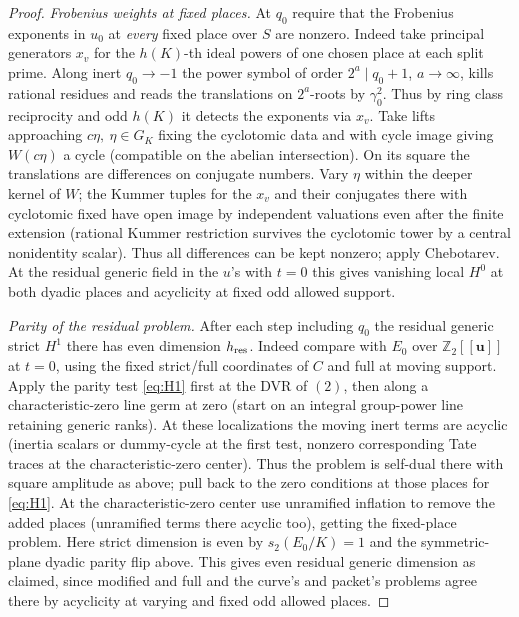\begin{proof}
\emph{Frobenius weights at fixed places.}
At \(q_0\) require that the Frobenius exponents in \(u_0\) at \emph{every} fixed place over \(S\) are nonzero. Indeed take principal generators \(x_v\) for the \(h(K)\)-th ideal powers of one chosen place at each split prime. Along inert \(q_0\to-1\) the power symbol of order \(2^a\mid q_0+1\), \(a\to\infty\), kills rational residues and reads the translations on \(2^a\)-roots by \(\gamma_0^2\). Thus by ring class reciprocity and odd \(h(K)\) it detects the exponents via \(x_v\). Take lifts approaching \(c\eta,\ \eta\in G_K\) fixing the cyclotomic data and with cycle image giving \(W(c\eta)\) a cycle (compatible on the abelian intersection). On its square the translations are differences on conjugate numbers. Vary \(\eta\) within the deeper kernel of \(W\); the Kummer tuples for the \(x_v\) and their conjugates there with cyclotomic fixed have open image by independent valuations even after the finite extension (rational Kummer restriction survives the cyclotomic tower by a central nonidentity scalar). Thus all differences can be kept nonzero; apply Chebotarev. At the residual generic field in the \(u\)'s with \(t=0\) this gives vanishing local \(H^0\) at both dyadic places and acyclicity at fixed odd allowed support.

\emph{Parity of the residual problem.}
After each step including \(q_0\) the residual generic strict \(H^1\) there has even dimension \(h_{\rm res}\). Indeed compare with \(E_0\) over \(\mathbb Z_2[[\mathbf u]]\) at \(t=0\), using the fixed strict/full coordinates of \(C\) and full at moving support. Apply the parity test \eqref{eq:H1} first at the DVR of \((2)\), then along a characteristic-zero line germ at zero (start on an integral group-power line retaining generic ranks). At these localizations the moving inert terms are acyclic (inertia scalars or dummy-cycle at the first test, nonzero corresponding Tate traces at the characteristic-zero center). Thus the problem is self-dual there with square amplitude as above; pull back to the zero conditions at those places for \eqref{eq:H1}. At the characteristic-zero center use unramified inflation to remove the added places (unramified terms there acyclic too), getting the fixed-place problem. Here strict dimension is even by \(s_2(E_0/K)=1\) and the symmetric-plane dyadic parity flip above. This gives even residual generic dimension as claimed, since modified and full and the curve's and packet's problems agree there by acyclicity at varying and fixed odd allowed places.


\end{proof}
